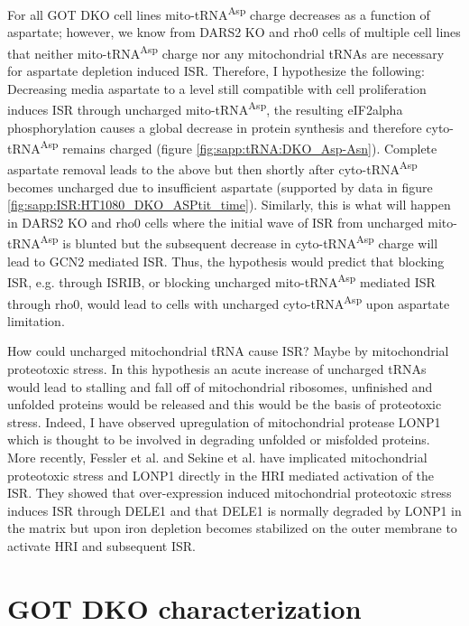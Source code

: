 For all GOT DKO cell lines mito-tRNA\textsuperscript{Asp} charge decreases as a function of aspartate; however, we know from DARS2 KO and rho0 cells of multiple cell lines that neither mito-tRNA\textsuperscript{Asp} charge nor any mitochondrial tRNAs are necessary for aspartate depletion induced ISR.
Therefore, I hypothesize the following:
Decreasing media aspartate to a level still compatible with cell proliferation induces ISR through uncharged mito-tRNA\textsuperscript{Asp}, the resulting eIF2alpha phosphorylation causes a global decrease in protein synthesis and therefore cyto-tRNA\textsuperscript{Asp} remains charged (figure \ref{fig:sapp:tRNA:DKO_Asp-Asn}).
Complete aspartate removal leads to the above but then shortly after cyto-tRNA\textsuperscript{Asp} becomes uncharged due to insufficient aspartate (supported by data in figure \ref{fig:sapp:ISR:HT1080_DKO_ASPtit_time}).
Similarly, this is what will happen in DARS2 KO and rho0 cells where the initial wave of ISR from uncharged mito-tRNA\textsuperscript{Asp} is blunted but the subsequent decrease in cyto-tRNA\textsuperscript{Asp} charge will lead to GCN2 mediated ISR.
Thus, the hypothesis would predict that blocking ISR, e.g. through ISRIB, or blocking uncharged mito-tRNA\textsuperscript{Asp} mediated ISR through rho0, would lead to cells with uncharged cyto-tRNA\textsuperscript{Asp} upon aspartate limitation.

How could uncharged mitochondrial tRNA cause ISR?
Maybe by mitochondrial proteotoxic stress.
In this hypothesis an acute increase of uncharged tRNAs would lead to stalling and fall off of mitochondrial ribosomes, unfinished and unfolded proteins would be released and this would be the basis of proteotoxic stress.
Indeed, I have observed upregulation of mitochondrial protease LONP1 which is thought to be involved in degrading unfolded or misfolded proteins.
More recently, Fessler et al. \cite{Fessler2022-ho} and Sekine et al. \cite{Sekine2023-qh} have implicated mitochondrial proteotoxic stress and LONP1 directly in the HRI mediated activation of the ISR.
They showed that over-expression induced mitochondrial proteotoxic stress induces ISR through DELE1 and that DELE1 is normally degraded by LONP1 in the matrix but upon iron depletion becomes stabilized on the outer membrane to activate HRI and subsequent ISR.






\FloatBarrier
\section{GOT DKO characterization}
